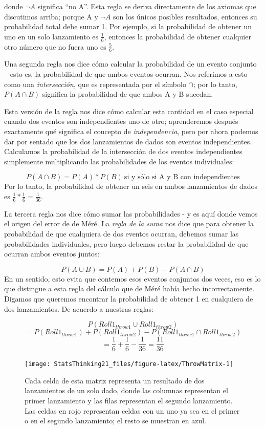 \documentclass[
  12pt,
]{book}
\begin{document}
donde \(\neg A\) significa ``no A''. Esta regla se deriva directamente de los axiomas que discutimos arriba; porque A y \(\neg A\) son los únicos posibles resultados, entonces su probabilidad total debe sumar 1. Por ejemplo, si la probabilidad de obtener un uno en un solo lanzamiento es \(\frac{1}{6}\), entonces la probabilidad de obtener cualquier otro número que no fuera uno es \(\frac{5}{6}\).

Una segunda regla nos dice cómo calcular la probabilidad de un evento conjunto -- esto es, la probabilidad de que ambos eventos ocurran. Nos referimos a esto como una \emph{intersección}, que es representada por el símbolo \(\cap\); por lo tanto, \(P(A \cap B)\) significa la probabilidad de que ambos A y B sucedan.

Esta versión de la regla nos dice cómo calcular esta cantidad en el caso especial cuando dos eventos son independientes uno de otro; aprenderemos después exactamente qué significa el concepto de \emph{independencia}, pero por ahora podemos dar por sentado que los dos lanzamientos de dados son eventos independientes. Calculamos la probabilidad de la intersección de dos eventos independientes simplemente multiplicando las probabilidades de los eventos individuales:

\[
P(A \cap B) = P(A) * P(B)\ \text{si y sólo si A y B con independientes}
\]
Por lo tanto, la probabilidad de obtener un seis en ambos lanzamientos de dados es \(\frac{1}{6}*\frac{1}{6}=\frac{1}{36}\).

La tercera regla nos dice cómo sumar las probabilidades - y es aquí donde vemos el origen del error de de Méré. La \emph{regla de la suma} nos dice que para obtener la probabilidad de que cualquiera de dos eventos ocurran, debemos sumar las probabilidades individuales, pero luego debemos restar la probabilidad de que ocurran ambos eventos juntos:

\[
P(A \cup B) = P(A) + P(B) - P(A \cap B)
\]
En un sentido, esto evita que contemos esos eventos conjuntos dos veces, eso es lo que distingue a esta regla del cálculo que de Méré había hecho incorrectamente. Digamos que queremos encontrar la probabilidad de obtener 1 en cualquiera de dos lanzamientos. De acuerdo a nuestras reglas:

\[
P(Roll1_{throw1} \cup Roll1_{throw2}) 
\]
\[
= P(Roll1_{throw1}) + P(Roll1_{throw2}) - P(Roll1_{throw1} \cap Roll1_{throw2}) 
\]
\[
= \frac{1}{6} + \frac{1}{6} - \frac{1}{36} = \frac{11}{36}
\]

\begin{figure}
\texttt{[image: StatsThinking21\_files/figure-latex/ThrowMatrix-1]} \caption{Cada celda de esta matriz representa un resultado de dos lanzamientos de un solo dado, donde las columnas representan el primer lanzamiento y las filas representan el segundo lanzamiento. Las celdas en rojo representan celdas con un uno ya sea en el primer o en el segundo lanzamiento; el resto se muestran en azul. }\label{fig:ThrowMatrix}
\end{figure}
\end{document}

